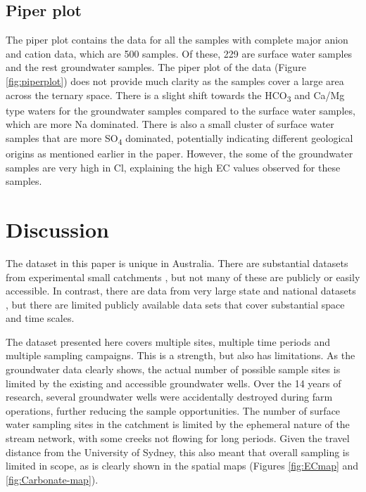 \documentclass[, manuscript]{copernicus}
\begin{document}
\subsection{Piper plot}

The piper plot contains the data for all the samples with complete major
anion and cation data, which are 500 samples. Of these, 229 are surface
water samples and the rest groundwater samples. The piper plot of the
data (Figure \ref{fig:piperplot}) does not provide much clarity as the
samples cover a large area across the ternary space. There is a slight
shift towards the HCO\textsubscript{3} and Ca/Mg type waters for the
groundwater samples compared to the surface water samples, which are
more Na dominated. There is also a small cluster of surface water
samples that are more SO\textsubscript{4} dominated, potentially
indicating different geological origins as mentioned earlier in the
paper. However, the some of the groundwater samples are very high in Cl,
explaining the high EC values observed for these samples.

\section{Discussion}

The dataset in this paper is unique in Australia. There are substantial
datasets from experimental small catchments
\citep[i.e.][]{Hughes2007, Summerel2006}, but not many of these are
publicly or easily accessible. In contrast, there are data from very
large state and national datasets \citep[i.e.][]{Jolly2001}, but there
are limited publicly available data sets that cover substantial space
and time scales.

The dataset presented here covers multiple sites, multiple time periods
and multiple sampling campaigns. This is a strength, but also has
limitations. As the groundwater data clearly shows, the actual number of
possible sample sites is limited by the existing and accessible
groundwater wells. Over the 14 years of research, several groundwater
wells were accidentally destroyed during farm operations, further
reducing the sample opportunities. The number of surface water sampling
sites in the catchment is limited by the ephemeral nature of the stream
network, with some creeks not flowing for long periods. Given the travel
distance from the University of Sydney, this also meant that overall
sampling is limited in scope, as is clearly shown in the spatial maps
(Figures \ref{fig:ECmap} and \ref{fig:Carbonate-map}).
\end{document}
